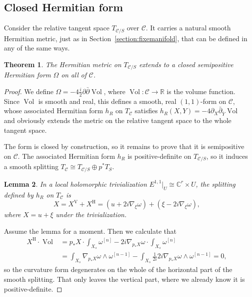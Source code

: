 \documentclass[11pt,a4paper]{amsart}
\newtheorem{theo}{Theorem}[section]
\newtheorem{lemm}[theo]{Lemma}
\theoremstyle{definition}
\theoremstyle{remark}
\newcommand{\RR}{\mathbb{R}}
\newcommand{\CC}{\mathbb{C}}
\newcommand{\Vol}{\mathop{\mathrm{Vol}}}
\def\ov#1{\overline{#1}}
\def\dbar{\bar\partial}
\def\conn{\nabla}
\def\kf{\omega}
\def\kcForm{\Omega}
\def\kcHerm{h_R}
\def\ton{u}
\def\^#1{^{[#1]}}
\def\KC{C}
\def\RKC{\mathcal{\KC}}
\begin{document}
\subsection*{Closed Hermitian form}

Consider the relative tangent space $T_{\RKC/S}$ over $\RKC$. It carries
a natural smooth Hermitian metric, just as in
Section~\ref{section:fixemanifold}, that can be defined in any of the
same ways.

\begin{theo}
The Hermitian metric on $T_{\RKC/S}$ extends to a closed semipositive
Hermitian form $\kcForm$ on all of $\RKC$.
\end{theo}


\begin{proof}
We define $\kcForm = -4 \frac{i}{2}\partial\dbar \Vol$, where
$\Vol : \RKC \to \RR$ is the volume function. Since $\Vol$ is
smooth and real, this defines a smooth, real $(1,1)$-form on
$\RKC$, whose associated Hermitian form $\kcHerm$ on $T_{\RKC}$
satisfies $\kcHerm(X, Y) = -4\partial_{X} \dbar_{\ov{Y}} \Vol$ and
obviously extends the metric on the relative tangent space to the whole
tangent space.

The form is closed by construction, so it remains to prove that it is
semipositive on $\RKC$.  The associated Hermitian form $\kcHerm$ is
positive-definite on $T_{\RKC/S}$, so it induces a smooth splitting
$T_{\RKC} \cong T_{\RKC/S} \oplus p^*T_S$. 

\begin{lemm}
\label{lemm:orthogonal.split}
In a local holomorphic trivialization $E^{1,1}|_U \cong \CC^r \times U$,
the splitting defined by $\kcHerm$ on $T_{\RKC}$ is 
$$
X 
= X^{\mathrm{V}} + X^{\mathrm{H}}
= (\ton + 2i \conn_{\xi}\kf)
+ (\xi - 2i \conn_{\xi}\kf),
$$
where $X = \ton + \xi$ under the trivialization.
\end{lemm}

Assume the lemma for a moment. Then we calculate that
\begin{align*}
X^{\mathrm{H}} \cdot \Vol
&= p_*X \cdot \int_{X_s} \kf\^n
- 2i\conn_{p_*X}\kf \cdot \int_{X_s} \kf\^n
\\
&= \int_{X_s} \conn_{p_*X}\kf \wedge \kf\^{n-1}
- \int_{X_s} \frac{1}{2i} 2i \conn_{p_*X}\kf \wedge \kf\^{n-1}
= 0,
\end{align*}
so the curvature form degenerates on the whole of the horizontal part of
the smooth splitting. That only leaves the vertical part, where we
already know it is positive-definite.
\end{proof}
\end{document}
